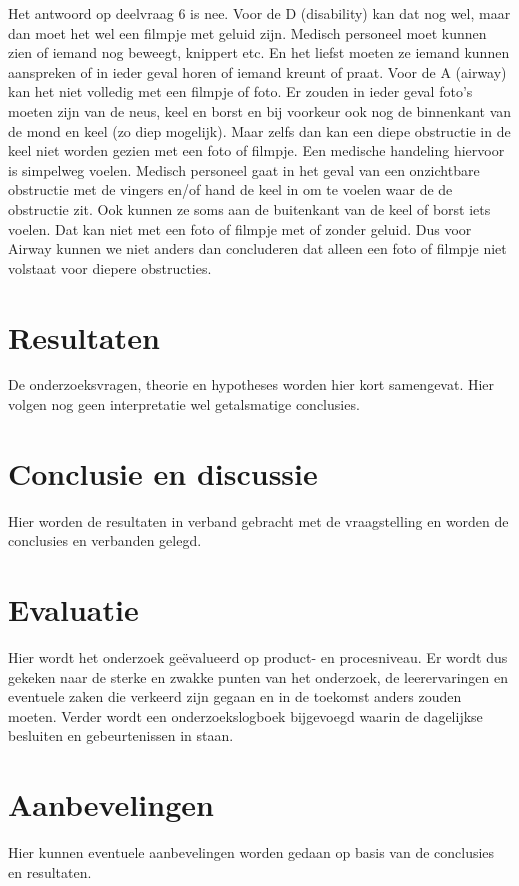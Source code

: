 \documentclass{article}
\begin{document}
Het antwoord op deelvraag 6 is nee. Voor de D (disability) kan dat nog wel, maar dan moet het wel een filmpje met geluid zijn. Medisch personeel moet kunnen zien of iemand nog beweegt, knippert etc. En het liefst moeten ze iemand kunnen aanspreken of in ieder geval horen of iemand kreunt of praat. 
Voor de A (airway) kan het niet volledig met een filmpje of foto. Er zouden in ieder geval foto’s moeten zijn van de neus, keel en borst en bij voorkeur ook nog de binnenkant van de mond en keel (zo diep mogelijk). Maar zelfs dan kan een diepe obstructie in de keel niet worden gezien met een foto of filmpje. Een medische handeling hiervoor is simpelweg voelen. Medisch personeel gaat in het geval van een onzichtbare obstructie met de vingers en/of hand de keel in om te voelen waar de de obstructie zit. Ook kunnen ze soms aan de buitenkant van de keel of borst iets voelen. Dat kan niet met een foto of filmpje met of zonder geluid. Dus voor Airway kunnen we niet anders dan concluderen dat alleen een foto of filmpje niet volstaat voor diepere obstructies.

\section{Resultaten}
De onderzoeksvragen, theorie en hypotheses worden hier kort samengevat. Hier volgen nog geen interpretatie wel getalsmatige conclusies.

\section{Conclusie en discussie}
Hier worden de resultaten in verband gebracht met de vraagstelling en worden de conclusies en verbanden gelegd.

\section{Evaluatie}
Hier wordt het onderzoek geëvalueerd op product- en procesniveau. Er wordt dus gekeken naar de sterke en zwakke punten van het onderzoek, de leerervaringen en eventuele zaken die verkeerd zijn gegaan en in de toekomst anders zouden moeten. Verder wordt een onderzoekslogboek bijgevoegd waarin de dagelijkse besluiten en gebeurtenissen in staan.

\section{Aanbevelingen}
Hier kunnen eventuele aanbevelingen worden gedaan op basis van de conclusies en resultaten.
\end{document}
